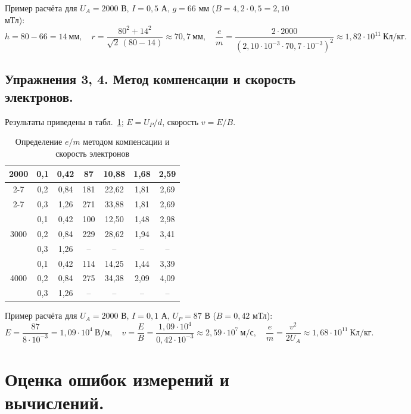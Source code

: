 \documentclass[12pt, a4paper]{article}
\begin{document}
	Пример расчёта для $U_A = 2000$ В, $I = 0{,}5$ А, $g = 66$ мм ($B = 4{,}2\cdot 0{,}5 = 2{,}10$ мТл):
	\[
	h = 80 - 66 = 14\ \text{мм}, \quad r = \frac{80^2 + 14^2}{\sqrt{2}\,(80 - 14)} \approx 70{,}7\ \text{мм}, \quad \frac{e}{m} = \frac{2\cdot 2000}{(2{,}10\cdot 10^{-3}\cdot 70{,}7\cdot 10^{-3})^2} \approx 1{,}82 \cdot 10^{11}\ \text{Кл/кг}.
	\]
	
	\subsection{Упражнения 3, 4. Метод компенсации и скорость электронов.}
	Результаты приведены в табл.~\ref{tab:ex3}; $E = U_P/d$, скорость $v = E/B$.
	
	\begin{table}[H]
		\caption{Определение $e/m$ методом компенсации и скорость электронов}
		\label{tab:ex3}
		\centering
		\small
		\begin{tabular}{|c|c|c|c|c|c|c|}
			\hline
			\multirow{3}{*}{2000} & 0,1 & 0,42 & 87 & 10,88 & 1,68 & 2,59 \\ \cline{2-7}
			& 0,2 & 0,84 & 181 & 22,62 & 1,81 & 2,69 \\ \cline{2-7}
			& 0,3 & 1,26 & 271 & 33,88 & 1,81 & 2,69 \\ \hline
			\multirow{3}{*}{3000} & 0,1 & 0,42 & 100 & 12,50 & 1,48 & 2,98 \\ \cline{2-7}
			& 0,2 & 0,84 & 229 & 28,62 & 1,94 & 3,41 \\ \cline{2-7}
			& 0,3 & 1,26 & -- & -- & -- & -- \\ \hline
			\multirow{3}{*}{4000} & 0,1 & 0,42 & 114 & 14,25 & 1,44 & 3,39 \\ \cline{2-7}
			& 0,2 & 0,84 & 275 & 34,38 & 2,09 & 4,09 \\ \cline{2-7}
			& 0,3 & 1,26 & -- & -- & -- & -- \\ \hline
		\end{tabular}
	\end{table}
	
	Пример расчёта для $U_A = 2000$ В, $I = 0{,}1$ А, $U_P = 87$ В ($B = 0{,}42$ мТл):
	\[
	E = \frac{87}{8\cdot 10^{-3}} = 1{,}09\cdot 10^{4}\ \text{В/м}, \quad v = \frac{E}{B} = \frac{1{,}09\cdot 10^{4}}{0{,}42\cdot 10^{-3}} \approx 2{,}59\cdot 10^{7}\ \text{м/с}, \quad \frac{e}{m} = \frac{v^2}{2U_A} \approx 1{,}68 \cdot 10^{11}\ \text{Кл/кг}.
	\]
	
	\section{Оценка ошибок измерений и вычислений.}
	
\end{document}

